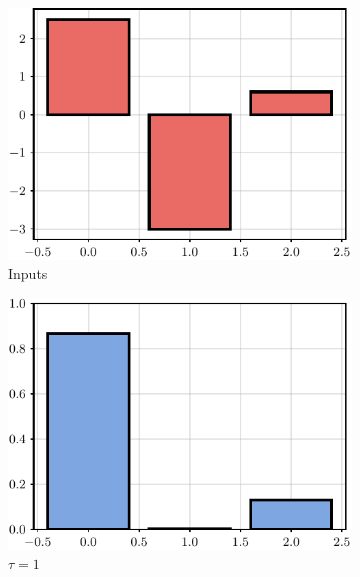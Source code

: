 \begin{figure}[t]
    \centering
    \begin{subfigure}[b]{0.24\textwidth}
    \includegraphics[width=\textwidth]{images/softmax_1.pdf}
    \caption{Inputs}
    \end{subfigure}
    \hfill
    \begin{subfigure}[b]{0.24\textwidth}
    \includegraphics[width=1.0\textwidth]{images/softmax_2.pdf}
    \caption{$\tau=1$}
    \end{subfigure}
    \hfill
    \begin{subfigure}[b]{0.24\textwidth}

\end{subfigure}
\end{figure}
